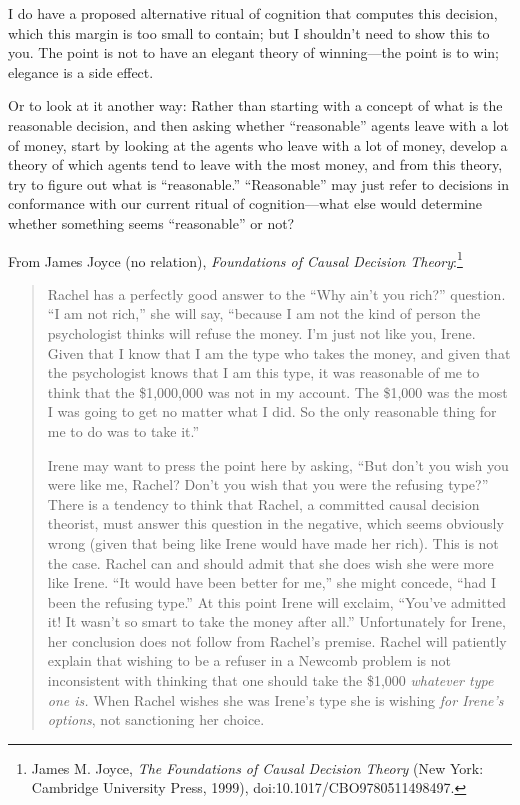 {
 I do have a proposed alternative ritual of cognition that computes
this decision, which this margin is too small to contain; but I
shouldn't need to show this to you. The point is not to
have an elegant theory of winning---the point is to win; elegance is a
side effect.}

{
 Or to look at it another way: Rather than starting with a concept
of what is the reasonable decision, and then asking whether
``reasonable'' agents leave with a
lot of money, start by looking at the agents who leave with a lot of
money, develop a theory of which agents tend to leave with the most
money, and from this theory, try to figure out what is
``reasonable.''
``Reasonable'' may just refer to
decisions in conformance with our current ritual of cognition---what
else would determine whether something seems
``reasonable'' or not?}

{
 From James Joyce (no relation), \textit{Foundations of Causal
Decision Theory}:\footnote{James M. Joyce, \textit{The Foundations of Causal Decision
Theory} (New York: Cambridge University Press, 1999),
doi:10.1017/CBO9780511498497.}}

\begin{quotation}
{
 Rachel has a perfectly good answer to the ``Why
ain't you rich?'' question.
``I am not rich,'' she will say,
``because I am not the kind of person the psychologist
thinks will refuse the money. I'm just not like you,
Irene. Given that I know that I am the type who takes the money, and
given that the psychologist knows that I am this type, it was
reasonable of me to think that the \$1,000,000 was not in my account.
The \$1,000 was the most I was going to get no matter what I did. So
the only reasonable thing for me to do was to take
it.''}

{
 Irene may want to press the point here by asking,
``But don't you wish you were like me,
Rachel? Don't you wish that you were the refusing
type?'' There is a tendency to think that Rachel, a
committed causal decision theorist, must answer this question in the
negative, which seems obviously wrong (given that being like Irene
would have made her rich). This is not the case. Rachel can and should
admit that she does wish she were more like Irene.
``It would have been better for
me,'' she might concede, ``had I
been the refusing type.'' At this point Irene will
exclaim, ``You've admitted it! It
wasn't so smart to take the money after
all.'' Unfortunately for Irene, her conclusion does
not follow from Rachel's premise. Rachel will patiently
explain that wishing to be a refuser in a Newcomb problem is not
inconsistent with thinking that one should take the \$1,000
\textit{whatever type one is.} When Rachel wishes she was
Irene's type she is wishing \textit{for
  Irene's options}, not sanctioning her choice.}
\end{quotation}

